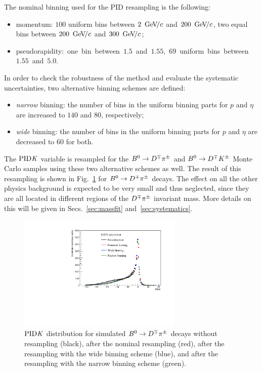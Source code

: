 The nominal binning used for the PID resampling is the following:
\begin{itemize}[noitemsep,topsep=0pt]
  \item momentum: $100$ uniform bins between $2~{\mathrm{\,Ge\kern -0.1em V\!/}c}$ and $200~{\mathrm{\,Ge\kern -0.1em V\!/}c}$, two equal bins between $200~{\mathrm{\,Ge\kern -0.1em V\!/}c}$ and $300~{\mathrm{\,Ge\kern -0.1em V\!/}c}$;
  \item pseudorapidity:~one~bin~between~$1.5$~and~$1.55$,~$69$~uniform~bins~between~$1.55$~and~$5.0$.
\end{itemize}
In order to check the robustness of the method and evaluate the systematic uncertainties, two alternative binning schemes are defined:
\begin{itemize}[noitemsep,topsep=0pt]
  \item \emph{narrow} binning: the number of bins in the uniform binning parts for $p$ and $\eta$ are increased to $140$ and $80$, respectively;
  \item \emph{wide} binning: the number of bins in the uniform binning parts for $p$ and $\eta$ are decreased to $60$ for both.
\end{itemize}
The $\rm{PID}\it{K}$ variable is resampled for the $B^0\rightarrow D^\mp\pi^\pm$ and $B^0\rightarrow D^\mp K^{\pm}$ Monte Carlo samples using these two alternative schemes as well. 
The result of this resampling is shown in Fig.~\ref{fig:pidkresampling} for $B^0\rightarrow D^\mp\pi^\pm$ decays.
The effect on all the other physics background is expected to be very small and thus neglected, since they are all located in different regions of the $D^\mp\pi^\pm$ invariant mass. More details on this will be given in Secs.~\ref{sec:massfit} and~\ref{sec:systematics}.
\begin{figure}[t]
        \begin{center}
                \includegraphics[width=0.7\textwidth]{02Selection/figs/PIDK_check_binning.pdf}
        \end{center}
        \vspace{-2mm}
        \caption{$\rm{PID}\it{K}$ distribution for simulated $B^0\rightarrow D^\mp\pi^\pm$ decays without resampling (black), after the nominal resampling (red),
        after the resampling with the wide binning scheme (blue), and after the resampling with the narrow binning scheme (green).}
        \label{fig:pidkresampling}
\end{figure}

